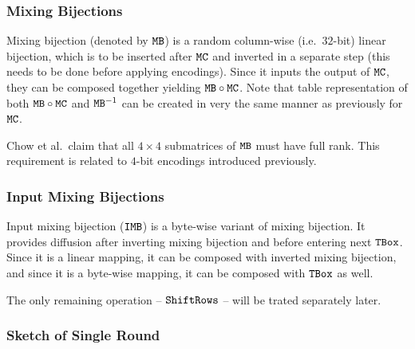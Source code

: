 
\subsubsection{Mixing Bijections}
	
	Mixing bijection (denoted by $\texttt{MB}$) is a random column-wise (i.e.\ $32$-bit) linear bijection, which is to be inserted after $\texttt{MC}$ and inverted in a separate step (this needs to be done before applying encodings). Since it inputs the output of $\texttt{MC}$, they can be composed together yielding $\texttt{MB}\circ\texttt{MC}$. Note that table representation of both $\texttt{MB}\circ\texttt{MC}$ and $\texttt{MB}^{-1}$ can be created in very the same manner as previously for $\texttt{MC}$.
	
	\begin{note}
	\label{note:fullrank}
		Chow et al.\ claim that all $4\times4$ submatrices of $\texttt{MB}$ must have full rank. This requirement is related to $4$-bit encodings introduced previously.
	\end{note}

\subsubsection{Input Mixing Bijections}
	
	Input mixing bijection ($\texttt{IMB}$) is a byte-wise variant of mixing bijection. It provides diffusion after inverting mixing bijection and before entering next $\texttt{TBox}$. Since it is a linear mapping, it can be composed with inverted mixing bijection, and since it is a byte-wise mapping, it can be composed with $\texttt{TBox}$ as well.
	
	The only remaining operation -- $\texttt{ShiftRows}$ -- will be trated separately later.

\subsubsection{Sketch of Single Round}
	
